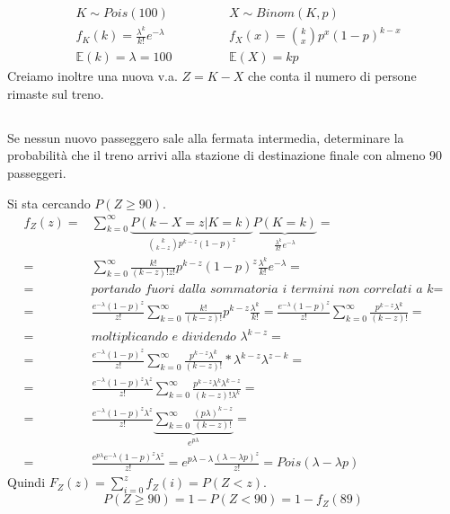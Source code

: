 \documentclass[a4paper]{article}
\newcommand{\E}[0]{\mathbb{E}}
\begin{document}
\begin{align*}
	&K \sim Pois(100) \qquad \qquad &X \sim Binom(K,p)\\
	&f_K(k) = \frac{\lambda^k}{k!}e^{-\lambda} &f_X(x) = \binom{k}{x}p^x(1-p)^{k-x}\\
	&\E(k) = \lambda=100 &\E(X) = kp
\end{align*}
Creiamo inoltre una nuova v.a. $Z = K-X$ che conta il numero di persone rimaste sul treno.
\subsection{}
Se nessun nuovo passeggero sale alla fermata intermedia, determinare la probabilità che il treno arrivi alla stazione di destinazione finale con almeno 90 passeggeri.

Si sta cercando $P(Z \geq 90)$.
\begin{align*}
	f_Z(z)=& \sum_{k=0}^{\infty} \underbrace{P(k - X = z | K=k)}_{\binom{k}{k-z}p^{k-z}(1-p)^{z}} \underbrace{P(K=k)}_{\frac{\lambda^k}{k!}e^{-\lambda}} =\\
	       =& \sum_{k=0}^{\infty} \frac{k!}{(k-z)! z!} p^{k-z}(1-p)^{z}\frac{\lambda^k}{k!}e^{-\lambda} = \\
	       =& \textit{portando fuori dalla sommatoria i termini non correlati a k} =\\
	       =& \frac{e^{-\lambda} (1-p)^z}{z!} \sum_{k=0}^{\infty} \frac{k!}{(k-z)!}p^{k-z}\frac{\lambda^k}{k!} = \frac{e^{-\lambda} (1-p)^z}{z!} \sum_{k=0}^{\infty} \frac{p^{k-z}\lambda^k}{(k-z)!} =\\
	       =& \textit{moltiplicando e dividendo $\lambda^{k-z}$} =\\
	       =& \frac{e^{-\lambda} (1-p)^z}{z!} \sum_{k=0}^{\infty} \frac{p^{k-z}\lambda^k}{(k-z)!} * \lambda^{k-z} \lambda^{z-k} =\\ 
	       =&\frac{e^{-\lambda} (1-p)^z \lambda^z}{z!} \sum_{k=0}^{\infty} \frac{p^{k-z}\lambda^k \lambda^{k-z}}{(k-z)! \lambda^k} = \\
	       =& \frac{e^{-\lambda} (1-p)^z \lambda^z}{z!} \underbrace{\sum_{k=0}^{\infty} \frac{(p\lambda)^{k-z}}{(k-z)!}}_{e^{p\lambda}}= \\ %
	       =& \frac{e^{p\lambda} e^{-\lambda} (1-p)^z \lambda^z}{z!} = e^{p\lambda - \lambda} \frac{(\lambda - \lambda p)^z}{z!} = Pois(\lambda - \lambda p)
\end{align*}
Quindi $F_Z(z) = \sum_{i=0}^{z} f_Z(i) = P(Z < z)$.\\
$$ P(Z \geq 90) = 1 - P(Z < 90) = 1 - f_Z(89)$$
\end{document}
